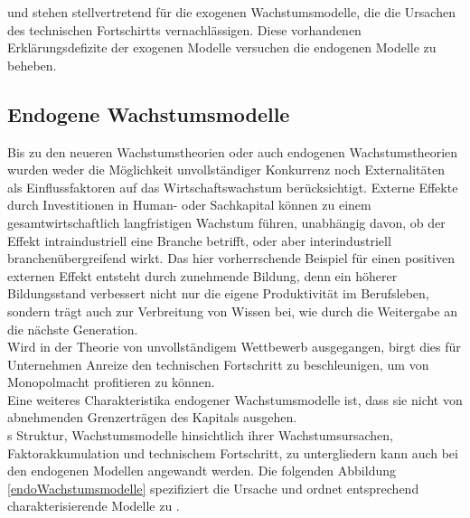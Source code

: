 \cite{Solow.1956} und \cite{Ramsey.1928} stehen stellvertretend für die exogenen Wachstumsmodelle, die die Ursachen des technischen Fortschirtts vernachlässigen. Diese vorhandenen Erklärungsdefizite der exogenen Modelle versuchen die endogenen Modelle zu beheben. 


\subsection{Endogene Wachstumsmodelle}
Bis zu den neueren Wachstumstheorien oder auch endogenen Wachstumstheorien wurden weder die Möglichkeit unvollständiger Konkurrenz noch Externalitäten als Einflussfaktoren auf das Wirtschaftswachstum berücksichtigt. Externe Effekte durch Investitionen in Human- oder Sachkapital können zu einem gesamtwirtschaftlich langfristigen Wachstum führen, unabhängig davon, ob der Effekt intraindustriell eine Branche betrifft, oder aber interindustriell branchenübergreifend wirkt. Das hier vorherrschende Beispiel für einen positiven externen Effekt entsteht durch zunehmende Bildung, denn ein höherer Bildungsstand verbessert nicht nur die eigene Produktivität im Berufsleben, sondern trägt auch zur Verbreitung von Wissen bei, wie durch die Weitergabe an die nächste Generation.\\
Wird in der Theorie von unvollständigem Wettbewerb ausgegangen, birgt dies für Unternehmen Anreize den technischen Fortschritt zu beschleunigen, um von Monopolmacht profitieren zu können. \\
%
Eine weiteres Charakteristika endogener Wachstumsmodelle ist, dass sie nicht von abnehmenden Grenzerträgen des Kapitals ausgehen.\\
%
\cite{Gandolfo.1998}s \citeyear{Gandolfo.1998} Struktur, Wachstumsmodelle hinsichtlich ihrer Wachstumsursachen, Faktorakkumulation und technischem Fortschritt, zu untergliedern kann auch bei den endogenen Modellen angewandt werden. Die folgenden Abbildung \ref{endoWachstumsmodelle} spezifiziert die Ursache und ordnet entsprechend charakterisierende Modelle zu \cite{Frenkel.1999}.\\
%
